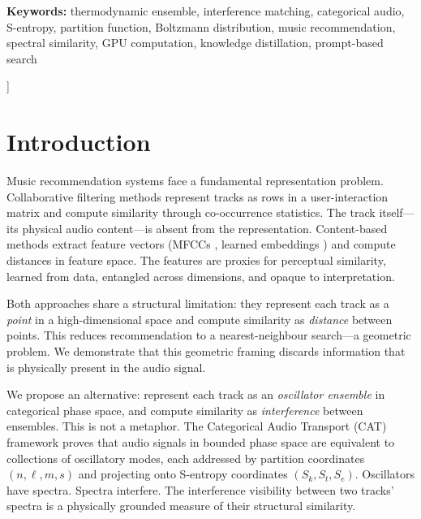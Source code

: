 \documentclass[11pt,twocolumn,a4paper]{article}
\newcommand{\Sk}{S_k}
\newcommand{\St}{S_t}
\newcommand{\Se}{S_e}
\begin{document}
\begin{@twocolumnfalse}
\begin{center}
\begin{minipage}{0.92\textwidth}
\vspace{8pt}
\noindent\textbf{Keywords:} thermodynamic ensemble, interference
matching, categorical audio, S-entropy, partition function, Boltzmann
distribution, music recommendation, spectral similarity, GPU
computation, knowledge distillation, prompt-based search
\end{minipage}

\vspace{18pt}
\end{center}
\end{@twocolumnfalse}
]



\section{Introduction}
\label{sec:introduction}

Music recommendation systems face a fundamental representation problem.
Collaborative filtering methods \citep{koren2009matrix,
covington2016youtube} represent tracks as rows in a user-interaction
matrix and compute similarity through co-occurrence statistics. The
track itself---its physical audio content---is absent from the
representation. Content-based methods extract feature vectors (MFCCs
\citep{logan2000mel}, learned embeddings \citep{wu2023clap,
radford2023whisper}) and compute distances in feature space. The
features are proxies for perceptual similarity, learned from data,
entangled across dimensions, and opaque to interpretation.

Both approaches share a structural limitation: they represent each
track as a \emph{point} in a high-dimensional space and compute
similarity as \emph{distance} between points. This reduces
recommendation to a nearest-neighbour search---a geometric problem. We
demonstrate that this geometric framing discards information that is
physically present in the audio signal.

We propose an alternative: represent each track as an \emph{oscillator
ensemble} in categorical phase space, and compute similarity as
\emph{interference} between ensembles. This is not a metaphor. The
Categorical Audio Transport (CAT) framework
\citep{sachikonye2026categorical} proves that audio signals in bounded
phase space are equivalent to collections of oscillatory modes, each
addressed by partition coordinates $(n, \ell, m, s)$ and projecting
onto S-entropy coordinates $(\Sk, \St, \Se)$. Oscillators have
spectra. Spectra interfere. The interference visibility between two
tracks' spectra is a physically grounded measure of their structural
similarity.
\end{document}
